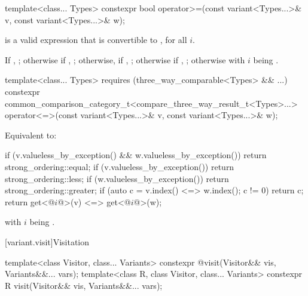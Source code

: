 %
\begin{itemdecl}
template<class... Types>
  constexpr bool operator>=(const variant<Types...>& v, const variant<Types...>& w);
\end{itemdecl}

\begin{itemdescr}
\pnum
\mandates
{} is a valid expression that is
convertible to , for all $i$.

\pnum
\returns
If , ;
otherwise if , ;
otherwise, if , ;
otherwise if , ;
otherwise  with $i$ being .
\end{itemdescr}

%
\begin{itemdecl}
template<class... Types> requires (three_way_comparable<Types> && ...)
  constexpr common_comparison_category_t<compare_three_way_result_t<Types>...>
    operator<=>(const variant<Types...>& v, const variant<Types...>& w);
\end{itemdecl}

\begin{itemdescr}
\pnum
\effects
Equivalent to:
\begin{codeblock}
if (v.valueless_by_exception() && w.valueless_by_exception())
  return strong_ordering::equal;
if (v.valueless_by_exception()) return strong_ordering::less;
if (w.valueless_by_exception()) return strong_ordering::greater;
if (auto c = v.index() <=> w.index(); c != 0) return c;
return get<@$i$@>(v) <=> get<@$i$@>(w);
\end{codeblock}
with $i$ being .
\end{itemdescr}

[variant.visit]{Visitation}

%
%
\begin{itemdecl}
template<class Visitor, class... Variants>
  constexpr @\seebelow@ visit(Visitor&& vis, Variants&&... vars);
template<class R, class Visitor, class... Variants>
  constexpr R visit(Visitor&& vis, Variants&&... vars);
\end{itemdecl}

